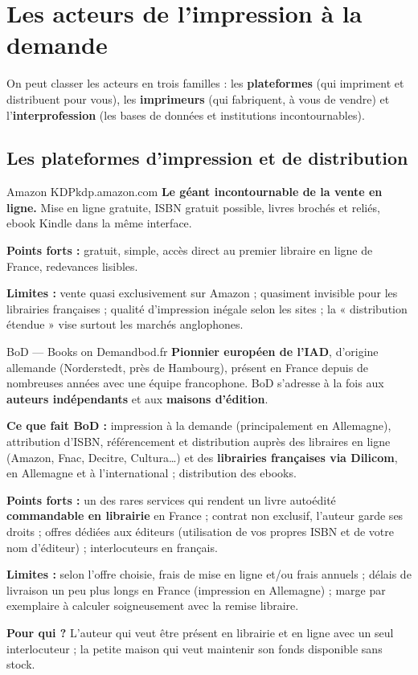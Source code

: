 \section{Les acteurs de l’impression à la demande}

On peut classer les acteurs en trois familles : les \textbf{plateformes}
(qui impriment et distribuent pour vous), les \textbf{imprimeurs}
(qui fabriquent, à vous de vendre) et l’\textbf{interprofession}
(les bases de données et institutions incontournables).

\subsection{Les plateformes d’impression et de distribution}

\begin{fiche}{Amazon KDP}{kdp.amazon.com}
\textbf{Le géant incontournable de la vente en ligne.} Mise en ligne
gratuite, ISBN gratuit possible, livres brochés et reliés, ebook Kindle
dans la même interface.\par
\textbf{Points forts :} gratuit, simple, accès direct au premier
libraire en ligne de France, redevances lisibles.\par
\textbf{Limites :} vente quasi exclusivement sur Amazon ; quasiment
invisible pour les librairies françaises ; qualité d’impression
inégale selon les sites ; la « distribution étendue » vise surtout les
marchés anglophones.
\end{fiche}

\begin{fiche}{BoD — Books on Demand}{bod.fr}
\textbf{Pionnier européen de l’IAD}, d’origine allemande (Norderstedt,
près de Hambourg), présent en France depuis de nombreuses années avec une
équipe francophone. BoD s’adresse à la fois aux \textbf{auteurs
indépendants} et aux \textbf{maisons d’édition}.\par
\textbf{Ce que fait BoD :} impression à la demande (principalement en
Allemagne), attribution d’ISBN, référencement et distribution auprès des
libraires en ligne (Amazon, Fnac, Decitre, Cultura…) et des
\textbf{librairies françaises via Dilicom}, en Allemagne et à
l’international ; distribution des ebooks.\par
\textbf{Points forts :} un des rares services qui rendent un livre
autoédité \textbf{commandable en librairie} en France ; contrat non
exclusif, l’auteur garde ses droits ; offres dédiées aux éditeurs
(utilisation de vos propres ISBN et de votre nom d’éditeur) ;
interlocuteurs en français.\par
\textbf{Limites :} selon l’offre choisie, frais de mise en ligne et/ou
frais annuels ; délais de livraison un peu plus longs en France
(impression en Allemagne) ; marge par exemplaire à calculer
soigneusement avec la remise libraire.\par
\textbf{Pour qui ?} L’auteur qui veut être présent en librairie et en
ligne avec un seul interlocuteur ; la petite maison qui veut maintenir
son fonds disponible sans stock.
\end{fiche}

